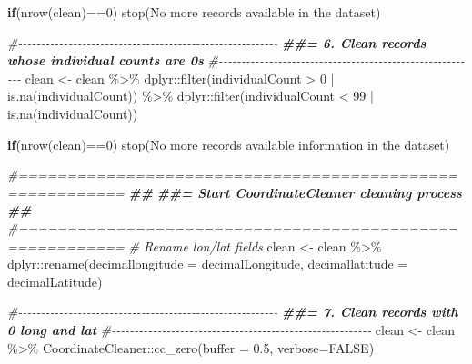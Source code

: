 \documentclass[
]{article}
\newenvironment{Shaded}{\begin{snugshade}}{\end{snugshade}}
\newcommand{\AttributeTok}[1]{\textcolor[rgb]{0.77,0.63,0.00}{#1}}
\newcommand{\CommentTok}[1]{\textcolor[rgb]{0.56,0.35,0.01}{\textit{#1}}}
\newcommand{\ConstantTok}[1]{\textcolor[rgb]{0.00,0.00,0.00}{#1}}
\newcommand{\ControlFlowTok}[1]{\textcolor[rgb]{0.13,0.29,0.53}{\textbf{#1}}}
\newcommand{\DecValTok}[1]{\textcolor[rgb]{0.00,0.00,0.81}{#1}}
\newcommand{\DocumentationTok}[1]{\textcolor[rgb]{0.56,0.35,0.01}{\textbf{\textit{#1}}}}
\newcommand{\FloatTok}[1]{\textcolor[rgb]{0.00,0.00,0.81}{#1}}
\newcommand{\FunctionTok}[1]{\textcolor[rgb]{0.00,0.00,0.00}{#1}}
\newcommand{\NormalTok}[1]{#1}
\newcommand{\OtherTok}[1]{\textcolor[rgb]{0.56,0.35,0.01}{#1}}
\newcommand{\SpecialCharTok}[1]{\textcolor[rgb]{0.00,0.00,0.00}{#1}}
\newcommand{\StringTok}[1]{\textcolor[rgb]{0.31,0.60,0.02}{#1}}
\begin{document}
\begin{Shaded}
\begin{Highlighting}[]
\ControlFlowTok{if}\NormalTok{(}\FunctionTok{nrow}\NormalTok{(clean)}\SpecialCharTok{==}\DecValTok{0}\NormalTok{) }\FunctionTok{stop}\NormalTok{(}\StringTok{\textquotesingle{}No more records available in the dataset\textquotesingle{}}\NormalTok{)}

\CommentTok{\#{-}{-}{-}{-}{-}{-}{-}{-}{-}{-}{-}{-}{-}{-}{-}{-}{-}{-}{-}{-}{-}{-}{-}{-}{-}{-}{-}{-}{-}{-}{-}{-}{-}{-}{-}{-}{-}{-}{-}{-}{-}{-}{-}{-}{-}{-}{-}{-}{-}{-}{-}{-}{-}{-}{-}{-}{-}}
\DocumentationTok{\#\#= 6. Clean records whose individual counts are 0s}
\CommentTok{\#{-}{-}{-}{-}{-}{-}{-}{-}{-}{-}{-}{-}{-}{-}{-}{-}{-}{-}{-}{-}{-}{-}{-}{-}{-}{-}{-}{-}{-}{-}{-}{-}{-}{-}{-}{-}{-}{-}{-}{-}{-}{-}{-}{-}{-}{-}{-}{-}{-}{-}{-}{-}{-}{-}{-}{-}{-}}
\NormalTok{clean }\OtherTok{\textless{}{-}}\NormalTok{ clean }\SpecialCharTok{\%\textgreater{}\%}
\NormalTok{  dplyr}\SpecialCharTok{::}\FunctionTok{filter}\NormalTok{(individualCount }\SpecialCharTok{\textgreater{}} \DecValTok{0} \SpecialCharTok{|} \FunctionTok{is.na}\NormalTok{(individualCount)) }\SpecialCharTok{\%\textgreater{}\%}
\NormalTok{  dplyr}\SpecialCharTok{::}\FunctionTok{filter}\NormalTok{(individualCount }\SpecialCharTok{\textless{}} \DecValTok{99} \SpecialCharTok{|} \FunctionTok{is.na}\NormalTok{(individualCount))}

\ControlFlowTok{if}\NormalTok{(}\FunctionTok{nrow}\NormalTok{(clean)}\SpecialCharTok{==}\DecValTok{0}\NormalTok{) }\FunctionTok{stop}\NormalTok{(}\StringTok{\textquotesingle{}No more records available information in the dataset\textquotesingle{}}\NormalTok{)}

\CommentTok{\#=========================================================}
\DocumentationTok{\#\#}
\DocumentationTok{\#\#=  Start CoordinateCleaner cleaning process}
\DocumentationTok{\#\#}
\CommentTok{\#=========================================================}
\CommentTok{\# Rename lon/lat fields}
\NormalTok{clean }\OtherTok{\textless{}{-}}\NormalTok{ clean }\SpecialCharTok{\%\textgreater{}\%}
\NormalTok{  dplyr}\SpecialCharTok{::}\FunctionTok{rename}\NormalTok{(}\AttributeTok{decimallongitude =} \StringTok{\textquotesingle{}decimalLongitude\textquotesingle{}}\NormalTok{,}
                \AttributeTok{decimallatitude =} \StringTok{\textquotesingle{}decimalLatitude\textquotesingle{}}\NormalTok{)}

\CommentTok{\#{-}{-}{-}{-}{-}{-}{-}{-}{-}{-}{-}{-}{-}{-}{-}{-}{-}{-}{-}{-}{-}{-}{-}{-}{-}{-}{-}{-}{-}{-}{-}{-}{-}{-}{-}{-}{-}{-}{-}{-}{-}{-}{-}{-}{-}{-}{-}{-}{-}{-}{-}{-}{-}{-}{-}{-}{-}}
\DocumentationTok{\#\#= 7. Clean records with 0 long and lat}
\CommentTok{\#{-}{-}{-}{-}{-}{-}{-}{-}{-}{-}{-}{-}{-}{-}{-}{-}{-}{-}{-}{-}{-}{-}{-}{-}{-}{-}{-}{-}{-}{-}{-}{-}{-}{-}{-}{-}{-}{-}{-}{-}{-}{-}{-}{-}{-}{-}{-}{-}{-}{-}{-}{-}{-}{-}{-}{-}{-}}
\NormalTok{clean }\OtherTok{\textless{}{-}}\NormalTok{ clean }\SpecialCharTok{\%\textgreater{}\%}
\NormalTok{  CoordinateCleaner}\SpecialCharTok{::}\FunctionTok{cc\_zero}\NormalTok{(}\AttributeTok{buffer =} \FloatTok{0.5}\NormalTok{, }\AttributeTok{verbose=}\ConstantTok{FALSE}\NormalTok{)}


\end{Highlighting}
\end{Shaded}
\end{document}
